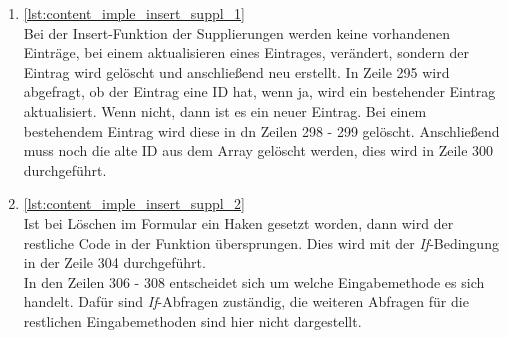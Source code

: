 \begin{enumerate}
\item \autoref{lst:content_imple_insert_suppl_1}\\
Bei der Insert-Funktion der Supplierungen werden keine vorhandenen Einträge, bei einem aktualisieren eines Eintrages, verändert, sondern der Eintrag wird gelöscht und anschließend neu erstellt. In Zeile 295 wird abgefragt, ob der Eintrag eine ID hat, wenn ja, wird ein bestehender Eintrag aktualisiert. Wenn nicht, dann ist es ein neuer Eintrag. Bei einem bestehendem Eintrag wird diese in dn Zeilen 298 - 299 gelöscht. Anschließend muss noch die alte ID aus dem Array gelöscht werden, dies wird in Zeile 300 durchgeführt. 

\newpage


\item \autoref{lst:content_imple_insert_suppl_2}\\
Ist bei Löschen im Formular ein Haken gesetzt worden, dann wird der restliche Code in der Funktion übersprungen. Dies wird mit der \textit{If}-Bedingung in der Zeile 304 durchgeführt.\\
In den Zeilen 306 - 308 entscheidet sich um welche Eingabemethode es sich handelt. Dafür sind \textit{If}-Abfragen zuständig, die weiteren Abfragen für die restlichen Eingabemethoden sind hier nicht dargestellt.




\end{enumerate}
